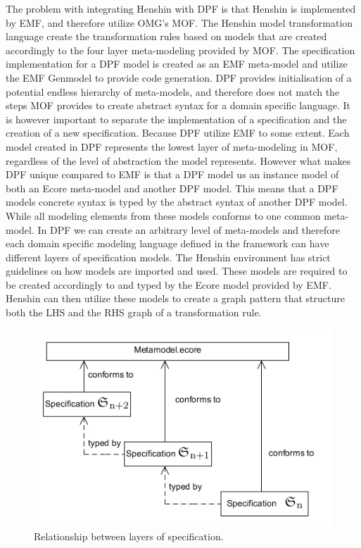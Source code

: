 The problem with integrating Henshin with DPF is that Henshin is implemented by
EMF, and therefore utilize OMG's MOF. The Henshin model transformation
language create the transformation rules based on models that are created
accordingly to the four layer meta-modeling provided by MOF. The
specification implementation for a DPF model is created as an EMF meta-model 
and utilize the EMF Genmodel to provide code generation. DPF provides
initialisation of a potential endless hierarchy of meta-models, and therefore
does not match the steps MOF provides to create abstract syntax for a domain
specific language. It is however important to separate the implementation of a
specification and the creation of a new specification. Because DPF utilize EMF
to some extent. Each model created in DPF represents the lowest layer of
meta-modeling in MOF, regardless of the level of abstraction the model
represents. However what makes DPF unique compared to EMF is that a DPF model us
an instance model of both an Ecore meta-model and another DPF model. This means
that a DPF models concrete syntax is typed by the abstract syntax of another DPF
model. While all modeling elements from these models conforms to one common
meta-model. In DPF we can create an arbitrary level of meta-models and therefore
each domain specific modeling language defined in the framework can have
different layers of specification models. The Henshin environment has strict
guidelines on how models are imported and used. These models are required to be
created accordingly to and typed by the Ecore model provided by EMF. Henshin
can then utilize these models to create a graph pattern that structure both the
LHS and the RHS graph of a transformation rule.

\begin{figure}[H]
	\centering
	\includegraphics[scale=0.7]{./Figures/metamodelSpecification.png}
	\caption[Specification relationship with core meta-model]
	{Relationship between layers of specification.}
	\label{fig:core_metamodel}
\end{figure}

